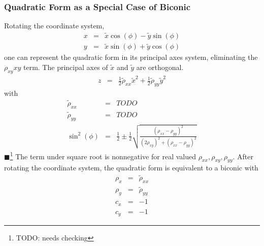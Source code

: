 \documentclass[12pt,a4paper,twoside,openright,BCOR10mm,headsepline,titlepage,abstracton,chapterprefix,final]{scrreprt}
\newcommand{\remark}[1]{{\color{red}$\blacksquare$}\footnote{{\color{red}#1}}}
\begin{document}
\subsubsection{Quadratic Form as a Special Case of Biconic}
Rotating the coordinate system,
\begin{eqnarray}
 x &=& \tilde{x} \cos(\phi) - \tilde{y} \sin(\phi) \\
 y &=& \tilde{x} \sin(\phi) + \tilde{y} \cos(\phi)
\end{eqnarray}
one can represent the quadratic form in its principal axes system, eliminating the $\rho_{xy} x y$ term. 
The principal axes of $\tilde{x}$ and $\tilde{y}$ are orthogonal.
\begin{eqnarray}
 z &=& \frac{1}{2} \tilde{\rho}_{xx} \tilde{x}^2 + \frac{1}{2} \tilde{\rho}_{yy} \tilde{y}^2
\end{eqnarray}
with
\begin{eqnarray}
 \tilde{\rho}_{xx} &=& TODO \\
 \tilde{\rho}_{yy} &=& TODO\\
 \sin^2(\phi) &=& \frac{1}{2} \pm \frac{1}{2} \sqrt{ \frac{(\rho_{xx}-\rho_{yy})^2}{(2 \rho_{xy})^2 + (\rho_{xx}-\rho_{yy})^2 } }
\end{eqnarray}\remark{TODO: needs checking}
The term under square root is nonnegative for real valued $\rho_{xx},\rho_{xy},\rho_{yy}$. 
After rotating the coordinate system, the quadratic form is equivalent to a biconic with
\begin{eqnarray}
 \rho_x &=& \tilde{\rho}_{xx} \\
 \rho_y &=& \tilde{\rho}_{yy} \\
 c_x &=& -1 \\
 c_y &=& -1
\end{eqnarray}
\end{document}

